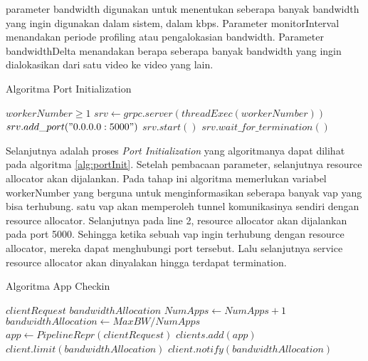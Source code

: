         parameter bandwidth digunakan untuk menentukan seberapa banyak bandwidth yang ingin digunakan dalam sistem, dalam kbps.
        Parameter monitorInterval menandakan periode profiling atau pengalokasian bandwidth. Parameter bandwidthDelta menandakan berapa seberapa banyak bandwidth yang ingin
        dialokasikan dari satu video ke video yang lain.

        \begin{algorithm}
        \caption{Algoritma Port Initialization}\label{alg:portInit}
        \begin{algorithmic}[1]
        \Require $workerNumber \geq 1$
        \State $srv \gets grpc.server(threadExec(workerNumber))$
        \State $srv.add\_port("0.0.0.0:5000")$
        \State $srv.start()$
        \State $srv.wait\_for\_termination()$
        \end{algorithmic}
        \end{algorithm}

        Selanjutnya adalah proses \textit{Port Initialization} yang algoritmanya dapat dilihat pada algoritma \ref{alg:portInit}. Setelah pembacaan parameter, selanjutnya 
        resource allocator akan dijalankan. Pada tahap ini algoritma memerlukan variabel workerNumber yang berguna untuk menginformasikan seberapa banyak \gls{vap} yang bisa terhubung.
        satu \gls{vap} akan memperoleh tunnel komunikasinya sendiri dengan resource allocator. Selanjutnya pada line 2, resource allocator akan dijalankan pada port 5000. Sehingga ketika 
        sebuah \gls{vap} ingin terhubung dengan resource allocator, mereka dapat menghubungi port tersebut. Lalu selanjutnya service resource allocator akan dinyalakan hingga terdapat termination.

        \begin{algorithm}[tbh]
        \caption{Algoritma App Checkin}\label{alg:appCheckin}
        \begin{algorithmic}[1]
        \Require $clientRequest$
        \Ensure $bandwidthAllocation$
        \State $NumApps \gets NumApps + 1$
        \State $bandwidthAllocation \gets MaxBW/NumApps$ 
        \State $app \gets PipelineRepr(clientRequest)$
        \State $clients.add(app)$
        \State $client.limit(bandwidthAllocation)$
        \State $client.notify(bandwidthAllocation)$
        \EndFor
        \end{algorithmic}
        \end{algorithm}

